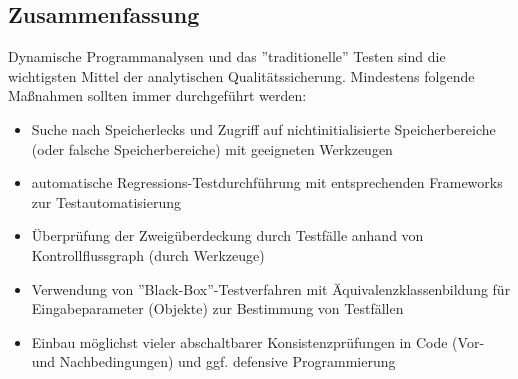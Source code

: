 \subsection{Zusammenfassung}
Dynamische Programmanalysen und das ''traditionelle'' Testen sind die wichtigsten Mittel der analytischen Qualitätssicherung. Mindestens folgende Maßnahmen sollten immer durchgeführt werden:
\begin{itemize}
	\item Suche nach Speicherlecks und Zugriff auf nichtinitialisierte Speicherbereiche (oder falsche Speicherbereiche) mit geeigneten Werkzeugen
	\item automatische Regressions-Testdurchführung mit entsprechenden Frameworks zur Testautomatisierung
	\item Überprüfung der Zweigüberdeckung durch Testfälle anhand von Kontrollflussgraph (durch Werkzeuge)
	\item Verwendung von ''Black-Box''-Testverfahren mit Äquivalenzklassenbildung für Eingabeparameter (Objekte) zur Bestimmung von Testfällen
	\item Einbau möglichst vieler abschaltbarer Konsistenzprüfungen in Code (Vor- und Nachbedingungen) und ggf. defensive Programmierung
\end{itemize}




